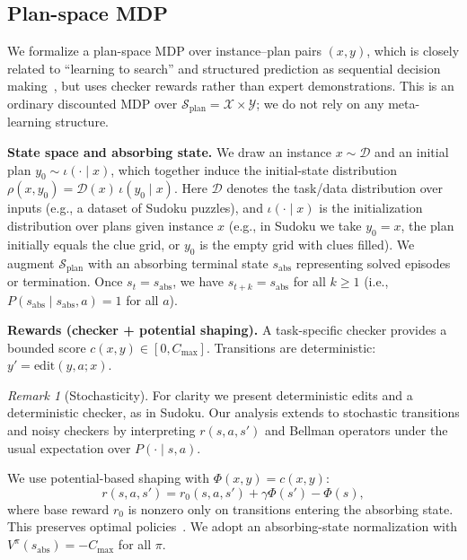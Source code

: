 \documentclass{article}
\theoremstyle{plain}
\theoremstyle{definition}
\theoremstyle{remark}
\newtheorem{remark}[theorem]{Remark}
\newcommand{\XX}{\mathcal{X}}
\newcommand{\YY}{\mathcal{Y}}
\newcommand{\SSS}{\mathcal{S}}
\begin{document}
{\subsection{Plan-space MDP}
\label{sec:meta_mdp}
We formalize a plan-space MDP over instance--plan pairs $(x,y)$, which is closely related to ``learning to search'' and structured prediction as sequential decision making~\citep{Daume2009SEARN,Ross2011DAgger,Chang2015LOLS}, but uses checker rewards rather than expert demonstrations.
This is an ordinary discounted MDP over $\SSS_{\mathrm{plan}}=\XX\times\YY$; we do not rely on any meta-learning structure.

\textbf{State space and absorbing state.}
We draw an instance $x \sim \mathcal{D}$ and an initial plan $y_0 \sim \iota(\cdot \mid x)$, which together induce the initial-state distribution $\rho(x,y_0)=\mathcal{D}(x)\,\iota(y_0\mid x)$.
Here $\mathcal{D}$ denotes the task/data distribution over inputs (e.g., a dataset of Sudoku puzzles), and $\iota(\cdot \mid x)$ is the initialization distribution over plans given instance $x$ (e.g., in Sudoku we take $y_0=x$, the plan initially equals the clue grid, or $y_0$ is the empty grid with clues filled).
We augment $\SSS_{\mathrm{plan}}$ with an absorbing terminal state $s_{\mathrm{abs}}$ representing solved episodes or termination.
Once $s_t=s_{\mathrm{abs}}$, we have $s_{t+k}=s_{\mathrm{abs}}$ for all $k\ge 1$ (i.e., $P(s_{\mathrm{abs}}\mid s_{\mathrm{abs}},a)=1$ for all $a$).

\textbf{Rewards (checker + potential shaping).}
A task-specific checker provides a bounded score $c(x,y)\in[0,C_{\max}]$.
Transitions are deterministic: $y'=\mathrm{edit}(y,a;x)$.
\begin{remark}[Stochasticity]
For clarity we present deterministic edits and a deterministic checker, as in Sudoku.
Our analysis extends to stochastic transitions and noisy checkers by interpreting $r(s,a,s')$ and Bellman operators under the usual expectation over $P(\cdot\mid s,a)$.
\end{remark}


We use potential-based shaping with $\Phi(x,y)=c(x,y)$:
\begin{equation}
r(s,a,s') = r_0(s,a,s') + \gamma \Phi(s') - \Phi(s),
\label{eq:shaping}
\end{equation}
where base reward $r_0$ is nonzero only on transitions entering the absorbing state.
This preserves optimal policies~\citep{Ng1999Shaping}.
We adopt an absorbing-state normalization with $V^\pi(s_{\mathrm{abs}})=-C_{\max}$ for all $\pi$.

}
\end{document}

